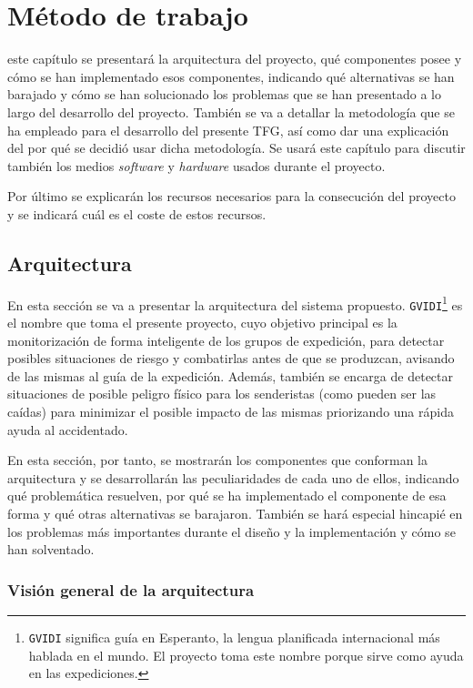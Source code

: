 \chapter{Método de trabajo}
\label{chap:metodo}

 este capítulo se presentará la arquitectura del proyecto, qué componentes posee y cómo se han implementado esos componentes, indicando qué alternativas se han barajado y cómo se han solucionado los problemas que se han presentado a lo largo del desarrollo del proyecto. También se va a detallar la metodología que se ha empleado para el desarrollo del presente \ac{TFG}, así como dar una explicación del por qué se decidió usar dicha metodología. Se usará este capítulo para discutir también los medios \textit{software} y \textit{hardware} usados durante el proyecto.

Por último se explicarán los recursos necesarios para la consecución del proyecto y se indicará cuál es el coste de estos recursos.

\section{Arquitectura}

En esta sección se va a presentar la arquitectura del sistema propuesto. \texttt{GVIDI}\footnote{\texttt{GVIDI} significa guía en Esperanto, la lengua planificada internacional más hablada en el mundo. El proyecto toma este nombre porque sirve como ayuda en las expediciones.} es el nombre que toma el presente proyecto, cuyo objetivo principal es la monitorización de forma inteligente de los grupos de expedición, para detectar posibles situaciones de riesgo y combatirlas antes de que se produzcan, avisando de las mismas al guía de la expedición. Además, también se encarga de detectar situaciones de posible peligro físico para los senderistas (como pueden ser las caídas) para minimizar el posible impacto de las mismas priorizando una rápida ayuda al accidentado. 

En esta sección, por tanto, se mostrarán los componentes que conforman la arquitectura y se desarrollarán las peculiaridades de cada uno de ellos, indicando qué problemática resuelven, por qué se ha implementado el componente de esa forma y qué otras alternativas se barajaron. También se hará especial hincapié en los problemas más importantes durante el diseño y la implementación y cómo se han solventado.

\subsection{Visión general de la arquitectura}

